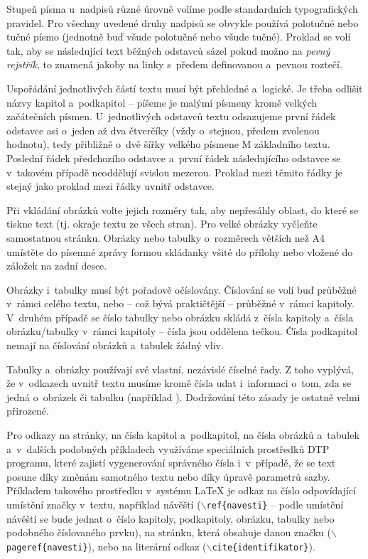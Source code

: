 Stupeň písma u~nadpisů různé úrovně volíme podle standardních typografických pravidel. 
Pro všechny uvedené druhy nadpisů se obvykle používá polotučné nebo tučné písmo (jednotně buď všude polotučné nebo všude tučné). Proklad se volí tak, aby se následující text běžných odstavců sázel pokud možno na {\it pevný rejstřík}, to znamená jakoby na linky s~předem definovanou a~pevnou roztečí.

Uspořádání jednotlivých částí textu musí být přehledné a~logické. Je třeba odlišit názvy kapitol a~podkapitol -- píšeme je malými písmeny kromě velkých začátečních písmen. U~jednotlivých odstavců textu odsazujeme první řádek odstavce asi o~jeden až dva čtverčíky (vždy o~stejnou, předem zvolenou hodnotu), tedy přibližně o~dvě šířky velkého písmene M základního textu. Poslední řádek předchozího odstavce a~první řádek následujícího odstavce se v~takovém případě neoddělují svislou mezerou. Proklad mezi těmito řádky je stejný jako proklad mezi řádky uvnitř odstavce.

Při vkládání obrázků volte jejich rozměry tak, aby nepřesáhly oblast, do které se tiskne text (tj. okraje textu ze všech stran). Pro velké obrázky vyčleňte samostatnou stránku. Obrázky nebo tabulky o~rozměrech větších než A4 umístěte do písemné zprávy formou skládanky všité do přílohy nebo vložené do záložek na zadní desce.

Obrázky i~tabulky musí být pořadově očíslovány. Číslování se volí buď průběžné v~rámci celého textu, nebo -- což bývá praktičtější -- průběžné v~rámci kapitoly. V~druhém případě se číslo tabulky nebo obrázku skládá z~čísla kapitoly a~čísla obrázku/tabulky v~rámci kapitoly -- čísla jsou oddělena tečkou. Čísla podkapitol nemají na číslování obrázků a~tabulek žádný vliv.

Tabulky a~obrázky používají své vlastní, nezávislé číselné řady. Z toho vyplývá, že v~odkazech uvnitř textu musíme kromě čísla udat i~informaci o~tom, zda se jedná o~obrázek či tabulku (například ). Dodržování této zásady je ostatně velmi přirozené.

Pro odkazy na stránky, na čísla kapitol a~podkapitol, na čísla obrázků a~tabulek a~v~dalších podobných příkladech využíváme speciálních prostředků DTP programu, které zajistí vygenerování správného čísla i~v~případě, že se text posune díky změnám samotného textu nebo díky úpravě parametrů sazby. Příkladem takového prostředku v~systému LaTeX je odkaz na číslo odpovídající umístění značky v~textu, například návěští ($\backslash${\tt ref\{navesti\}} -- podle umístění návěští se bude jednat o~číslo kapitoly, podkapitoly, obrázku, tabulky nebo podobného číslovaného prvku), na stránku, která obsahuje danou značku ($\backslash${\tt pageref\{navesti\}}), nebo na literární odkaz ($\backslash${\tt cite\{identifikator\}}).


